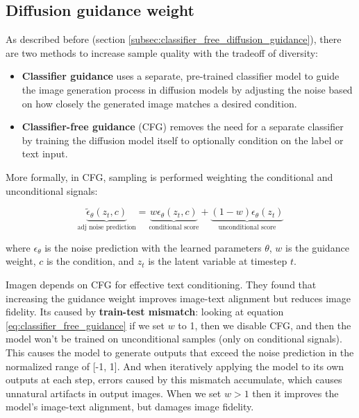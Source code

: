 \subsection{Diffusion guidance weight}
\label{subsec:imagen_diffusion_guidance_weight}

As described before (section \ref{subsec:classifier_free_diffusion_guidance}), there are two methods to increase sample quality with the tradeoff of diversity:

\begin{itemize}
    \item \textbf{Classifier guidance} uses a separate, pre-trained classifier model to guide the image generation process in diffusion models by adjusting the noise based on how closely the generated image matches a desired condition.
    
    \item \textbf{Classifier-free guidance} (CFG) removes the need for a separate classifier by training the diffusion model itself to optionally condition on the label or text input.
\end{itemize}

More formally, in CFG, sampling is performed weighting the conditional and unconditional signals:

\begin{equation}
    \underbrace{\tilde{\epsilon}_\theta (z_t, c)}_{\text{adj noise prediction}} = \underbrace{w \epsilon_\theta (z_t, c)}_{\text{conditional score}} + \underbrace{(1 - w) \epsilon_\theta (z_t)}_{\text{unconditional score}}
    \label{eq:classifier_free_guidance}
\end{equation}

where $\epsilon_\theta$ is the noise prediction with the learned parameters $\theta$, $w$ is the guidance weight, $c$ is the condition, and $z_t$ is the latent variable at timestep $t$.

Imagen depends on CFG for effective text conditioning. They found that increasing the guidance weight improves image-text alignment but reduces image fidelity. Its caused by \textbf{train-test mismatch}: looking at equation \ref{eq:classifier_free_guidance} if we set $w$ to 1, then we disable CFG, and then the model won't be trained on unconditional samples (only on conditional signals). This causes the model to generate outputs that exceed the noise prediction in the normalized range of [-1, 1]. And when iteratively applying the model to its own outputs at each step, errors caused by this mismatch accumulate, which causes unnatural artifacts in output images. When we set $w>1$ then it improves the model's image-text alignment, but damages image fidelity.

